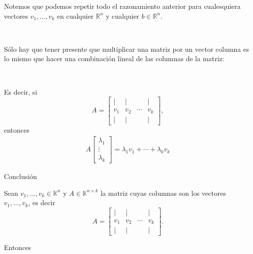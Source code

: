 \documentclass[handout]{beamer} %
\newcommand{\R}{\mathbb R}
\newcommand{\K}{\mathbb K}
\begin{document}
    \begin{frame}
    Notemos que podemos repetir todo el razonamiento anterior para cualesquiera vectores $v_1, ..., v_k$ en cualquier $\R^n$ y cualquier $b\in\R^n$.\pause
    
    \
    
    Sólo hay que tener presente que multiplicar una matriz por un vector columna es lo mismo que hacer una combinación lineal de las columnas de la matriz:\pause
    
    \
    
    Es decir, si
    $$
    A=\left[
    \begin{array}{cccc}
    \mid& \mid& &\mid\\
    v_1 & v_2 & \cdots &v_k\\
    \mid& \mid& &\mid
    \end{array}
    \right]
    ,$$ 
    entonces
    \begin{align*}
    A\left[
    \begin{array}{c}
    \lambda_1\\\vdots\\\lambda_k
    \end{array}
    \right]=
    \lambda_1v_1+\cdots+\lambda_kv_k
    \end{align*}
    \end{frame}
    
    \begin{frame}
    
    \begin{block}{Conclusión}
        
        Sean $v_1, ..., v_k\in\K^n$ y $A\in\K^{n\times k}$ la matriz cuyas  columnas son los vectores $v_1, ..., v_k$, es decir
    $$
    A=\left[
    \begin{array}{cccc}
    \mid& \mid& &\mid\\
    v_1 & v_2 & \cdots &v_k\\
    \mid& \mid& &\mid
    \end{array}
    \right]
    .$$\pause
    
    Entonces
\end{block}
    \end{frame}
    
\end{document}
